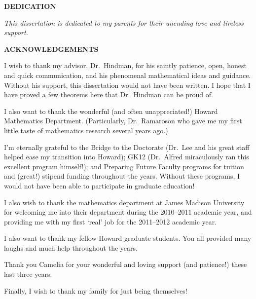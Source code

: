 \newcommand{\dedication}{
  \clearpage
  
  \begin{center}
    \textbf{DEDICATION}

    \vspace{3em}

    \textsl{This dissertation is dedicated to my parents for their unending love and tireless support.}
  \end{center}
}

\newcommand{\acknowledgements}{
  \clearpage
  \begin{center}
    \textbf{ACKNOWLEDGEMENTS}
  \end{center}

  I wish to thank my advisor, Dr.~Hindman, for his saintly patience, open, honest and quick communication, and his phenomenal mathematical ideas and guidance. 
  Without his support, this dissertation would not have been written.  
  I hope that I have proved a few theorems here that Dr.~Hindman can be proud of.

  I also want to thank the wonderful (and often unappreciated!) Howard Mathematics Department. 
  (Particularly, Dr.~Ramaroson who gave me my first little taste of mathematics research several years ago.)

  I'm eternally grateful to the Bridge to the Doctorate (Dr.~Lee and his great staff helped ease my transition into Howard); GK12 (Dr.~Alfred miraculously ran this excellent program himself!); and Preparing Future Faculty programs for tuition and (great!) stipend funding throughout the years.  
  Without these programs, I would not have been able to participate in graduate education!

  I also wish to thank the mathematics department at James Madison University for welcoming me into their department during the 2010--2011 academic year, and providing me with my first `real' job for the 2011--2012 academic year.  

  I also want to thank my fellow Howard graduate students. 
  You all provided many laughs and much help throughout the years.

  Thank you Camelia for your wonderful and loving support (and patience!) these last three years.

  Finally, I wish to thank my family for just being themselves!
}

\thetitlepage
\dedication
\acknowledgements

